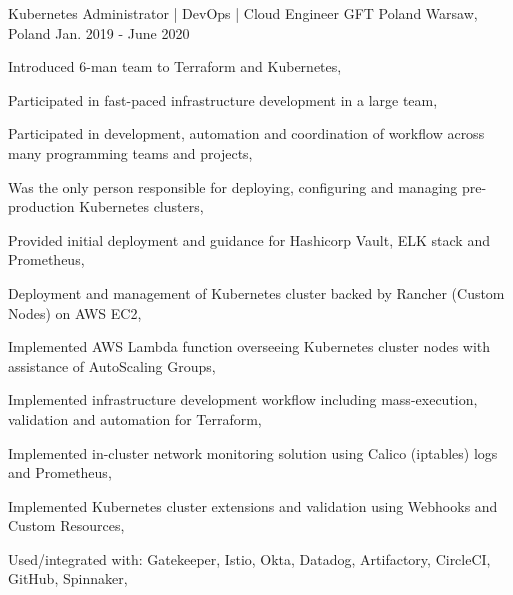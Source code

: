 \begin{cventries}
  \cventry
  {Kubernetes Administrator | DevOps | Cloud Engineer} %
  {GFT Poland} %
  {Warsaw, Poland} %
  {Jan. 2019 - June 2020} %
  {
    \begin{cvitems} %
      \item {Introduced 6-man team to Terraform and Kubernetes,}
      \item {Participated in fast-paced infrastructure development in a large team,}
      \item {Participated in development, automation and coordination of workflow across many programming teams and projects,}
      \item {Was the only person responsible for deploying, configuring and managing pre-production Kubernetes clusters,}
      \item {Provided initial deployment and guidance for Hashicorp Vault, ELK stack and Prometheus,}
      \item {Deployment and management of Kubernetes cluster backed by Rancher (Custom Nodes) on AWS EC2,}
      \item {Implemented AWS Lambda function overseeing Kubernetes cluster nodes with assistance of AutoScaling Groups,}
      \item {Implemented infrastructure development workflow including mass-execution, validation and automation for Terraform,}
      \item {Implemented in-cluster network monitoring solution using Calico (iptables) logs and Prometheus,}
      \item {Implemented Kubernetes cluster extensions and validation using Webhooks and Custom Resources,}
      \item {Used/integrated with: Gatekeeper, Istio, Okta, Datadog, Artifactory, CircleCI, GitHub, Spinnaker,}
    \end{cvitems}
  }


\end{cventries}
